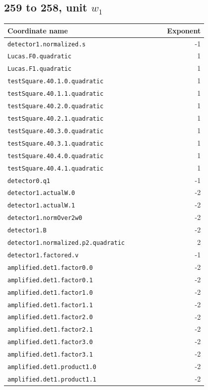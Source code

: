 \subsection*{259 to 258, unit $w_1$}
\small
\begin{longtable}{p{0.80\linewidth}r}
\toprule Coordinate name&Exponent\\\midrule\endhead
\texttt{detector1.normalized.s} & -1\\
\texttt{Lucas.F0.quadratic} & 1\\
\texttt{Lucas.F1.quadratic} & 1\\
\texttt{testSquare.40.1.0.quadratic} & 1\\
\texttt{testSquare.40.1.1.quadratic} & 1\\
\texttt{testSquare.40.2.0.quadratic} & 1\\
\texttt{testSquare.40.2.1.quadratic} & 1\\
\texttt{testSquare.40.3.0.quadratic} & 1\\
\texttt{testSquare.40.3.1.quadratic} & 1\\
\texttt{testSquare.40.4.0.quadratic} & 1\\
\texttt{testSquare.40.4.1.quadratic} & 1\\
\texttt{detector0.q1} & -1\\
\texttt{detector1.actualW.0} & -2\\
\texttt{detector1.actualW.1} & -2\\
\texttt{detector1.normOver2w0} & -2\\
\texttt{detector1.B} & -2\\
\texttt{detector1.normalized.p2.quadratic} & 2\\
\texttt{detector1.factored.v} & -1\\
\texttt{amplified.det1.factor0.0} & -2\\
\texttt{amplified.det1.factor0.1} & -2\\
\texttt{amplified.det1.factor1.0} & -2\\
\texttt{amplified.det1.factor1.1} & -2\\
\texttt{amplified.det1.factor2.0} & -2\\
\texttt{amplified.det1.factor2.1} & -2\\
\texttt{amplified.det1.factor3.0} & -2\\
\texttt{amplified.det1.factor3.1} & -2\\
\texttt{amplified.det1.product1.0} & -2\\
\texttt{amplified.det1.product1.1} & -2\\

\end{longtable}
